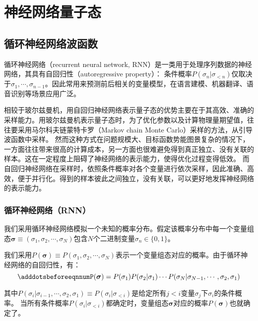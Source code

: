 \chapter{神经网络量子态}\label{chap:neural_network_quantum_state}
\section{循环神经网络波函数}
循环神经网络（recurrent neural network, RNN）是一类用于处理序列数据的神经网络，其具有自回归性（autoregressive property）：
条件概率$P(\sigma_n | \sigma_{<n})$仅取决于$\sigma_{1},\cdots,\sigma_{n-1}$。因此常用来预测前后相关的变量模型，在语言建模、机器翻译、语音识别等场景应用广泛。

相较于玻尔兹曼机，用自回归神经网络表示量子态的优势主要在于其高效、准确的采样能力。用玻尔兹曼机表示量子态时，为了优化参数以及计算物理量期望值，往往要采用马尔科夫链蒙特卡罗（Markov chain Monte Carlo）采样的方法，从引导波函数中采样。
然而这种方式在问题规模大、目标函数势能图景复杂的情况下，一方面往往带来很高的计算成本，另一方面也很难避免得到真正独立、没有关联的样本。这在一定程度上阻碍了神经网络的表示能力，使得优化过程变得低效。
而自回归神经网络在采样时，依照条件概率对各个变量进行依次采样，因此准确、高效，便于并行化。得到的样本彼此之间独立，没有关联，可以更好地发挥神经网络的表示能力。

\subsection{循环神经网络（RNN）}
我们采用循环神经网络模拟一个未知的概率分布。假定该概率分布中每一个变量组态$\boldsymbol{\sigma}\equiv (\sigma_{1}, \sigma_{2}, \cdots, \sigma_{N})$包含$N$个二进制变量$\sigma_n \in \{0,1\}$。

我们采用$P(\boldsymbol{\sigma})\equiv P(\sigma_{1}, \sigma_{2}, \cdots, \sigma_{N})$表示一个变量组态对应的概率。由于循环神经网络的自回归性，有：
\begin{equation} \label{eq:rnn_autoregressive}
    \adddotsbeforeeqnnum%
    P(\boldsymbol{\sigma})=P(\sigma_1)P(\sigma_{2}|\sigma_1)\cdots P(\sigma_{N} | \sigma_{N-1}, \cdots, \sigma_{2}, \sigma_1)
\end{equation}

其中$P(\sigma_{i}|\sigma_{i-1}, \cdots,\sigma_{2},\sigma_1)\equiv P(\sigma_i | \sigma_{<i})$是给定所有$j<i$变量$\sigma_j$下$\sigma_i$的条件概率。
当所有条件概率$P(\sigma_i | \sigma_{<i})$都确定时，变量组态$\boldsymbol{\sigma}$对应的概率$P(\boldsymbol{\sigma})$也就确定了。

